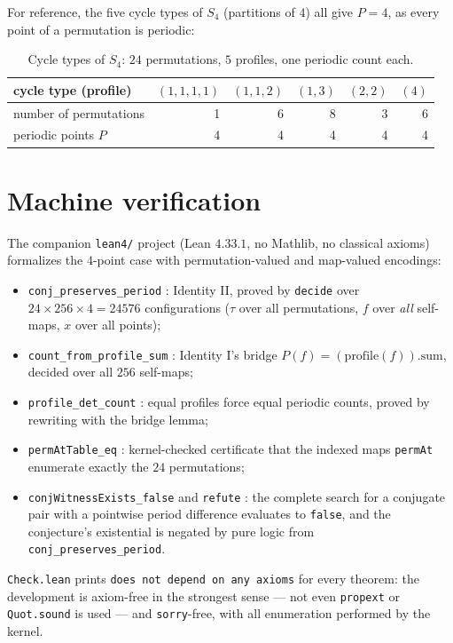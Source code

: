 \documentclass[11pt]{article}
\theoremstyle{definition}
\begin{document}
For reference, the five cycle types of $S_4$ (partitions of $4$) all give
$P=4$, as every point of a permutation is periodic:

\begin{table}[ht]
\centering
\begin{tabular}{lrrrrr}
\toprule
cycle type (profile) & $(1,1,1,1)$ & $(1,1,2)$ & $(1,3)$ & $(2,2)$ & $(4)$\\
\midrule
number of permutations & 1 & 6 & 8 & 3 & 6\\
periodic points $P$    & 4 & 4 & 4 & 4 & 4\\
\bottomrule
\end{tabular}
\caption{Cycle types of $S_4$: $24$ permutations, $5$ profiles, one periodic
count each.}
\label{tab:s4}
\end{table}

\section{Machine verification}

The companion \texttt{lean4/} project (Lean $4.33.1$, no Mathlib, no classical
axioms) formalizes the $4$-point case with permutation-valued and
map-valued encodings:

\begin{itemize}
\item \texttt{conj\_preserves\_period} : Identity II, proved by \texttt{decide}
over $24\times256\times4=24576$ configurations ($\tau$ over all permutations,
$f$ over \emph{all} self-maps, $x$ over all points);
\item \texttt{count\_from\_profile\_sum} : Identity I's bridge
$P(f)=(\text{profile}(f)).\mathrm{sum}$, decided over all $256$ self-maps;
\item \texttt{profile\_det\_count} : equal profiles force equal periodic counts,
proved by rewriting with the bridge lemma;
\item \texttt{permAtTable\_eq} : kernel-checked certificate that the indexed
maps \texttt{permAt} enumerate exactly the $24$ permutations;
\item \texttt{conjWitnessExists\_false} and \texttt{refute} : the complete
search for a conjugate pair with a pointwise period difference evaluates to
\texttt{false}, and the conjecture's existential is negated by pure logic from
\texttt{conj\_preserves\_period}.
\end{itemize}

\texttt{Check.lean} prints \texttt{does not depend on any axioms} for every
theorem: the development is axiom-free in the strongest sense --- not even
\texttt{propext} or \texttt{Quot.sound} is used --- and \texttt{sorry}-free,
with all enumeration performed by the kernel.
\end{document}
